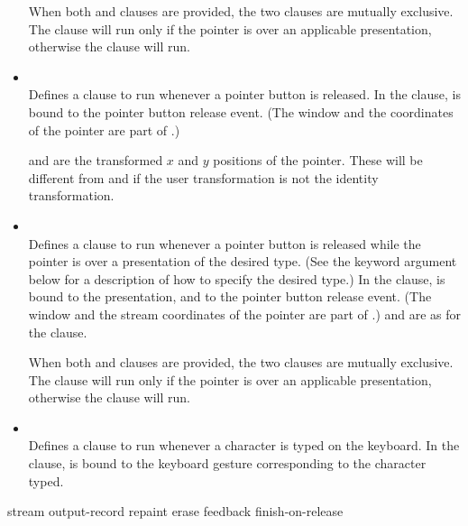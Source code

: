 \begin{itemize}
When both  and  clauses
are provided, the two clauses are mutually exclusive.  The
 clause will run only if the pointer is over an
applicable presentation, otherwise the  clause will
run.

\item { } \\
Defines a clause to run whenever a pointer button is released. In the clause,
 is bound to the pointer button release event. (The window and the
coordinates of the pointer are part of .)

 and  are the transformed $x$ and $y$ positions of the pointer.
These will be different from  and  if
the user transformation is not the identity transformation.

\item { } \\
Defines a clause to run whenever a pointer button is released while the pointer
is over a presentation of the desired type. (See the keyword argument
 below for a description of how to specify the desired type.)
In the clause,  is bound to the presentation, and 
to the pointer button release event.  (The window and the stream coordinates of
the pointer are part of .)   and  are as for the
 clause.

When both  and 
clauses are provided, the two clauses are mutually exclusive.  The
 clause will run only if the pointer is over an
applicable presentation, otherwise the  clause will
run.

\item { } \\
Defines a clause to run whenever a character is typed on the keyboard.  In the
clause,  is bound to the keyboard gesture corresponding to the
character typed.
\end{itemize}


 {stream output-record
                                  \key repaint erase feedback finish-on-release}

